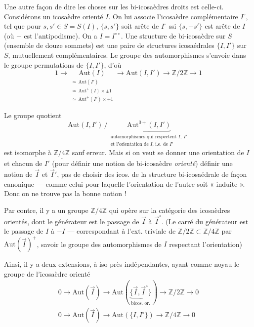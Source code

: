 \documentclass[11pt,a4paper]{article}
\begin{document}
Une autre façon de dire les choses sur les bi-icosaèdres droits est celle-ci. Considérons un icosaèdre orienté $I$. On lui associe l'icosaèdre complémentaire $I^\circ$, tel que pour $s,s'\in S = S(I)$, $\{s,s'\}$ soit arête de $I^\circ$ ssi $\{s,-s'\}$ est arête de $I$ (où $-$ est l'antipodisme). On a $I = I^{\circ\circ}$.  Une structure de bi-icosaèdre sur $S$ (ensemble de douze sommets) est une paire de structures icosaédrales $\{I,I'\}$ sur $S$, mutuellement complémentaires. Le groupe des automorphismes s'envoie dans le groupe  permutations de $\{I,I'\}$, d'où
\[
1 \longrightarrow \underset{\substack{\simeq\,\mathrm{Aut}(I')\\ \simeq\,\mathrm{Aut}^+(I)\times\pm1\\ \simeq\,\mathrm{Aut}^+(I')\times\pm1}}{\mathrm{Aut}(I)} \longrightarrow \mathrm{Aut}(I,I') \longrightarrow \mathbb Z/2\mathbb Z \longrightarrow 1
\]

Le groupe quotient
\[
\mathrm{Aut}(I,I')\,/\,\underbrace{\mathrm{Aut}^{0+}(I,I')}_{\substack{\text{automorphismes qui respectent } I,\ I'\\ \text{et l'orientation de } I \text{, i.e. de } I'}}
\]
est isomorphe à $\underline{\mathbb Z/4\mathbb Z}$ sauf erreur. Mais si on veut se donner une  orientation de $I$ et chacun de $I'$ (pour définir une notion de bi-icosaèdre \emph{orienté}) définir une notion de $\vec I$ et $\vec I'$,  pas  \struck{\ill{}} de choisir  des icos. de la structure bi-icosaédrale de façon canonique — comme celui pour laquelle l'orientation de l'autre soit « induite ». Donc on ne trouve pas la bonne notion !

Par contre, il y a un groupe $\mathbb Z/4\mathbb Z$ qui opère sur la catégorie des icosaèdres orientés, dont le générateur est  le passage de $\vec I$ à $\vec I^\circ$. (Le carré du générateur est le passage de $I$ à $-I$ — correspondant à l'ext. triviale de $\mathbb Z/2\mathbb Z\subset\mathbb Z/4\mathbb Z$ par $\mathrm{Aut}(\vec I)^+$, savoir le groupe des automorphismes de  $I$  respectant l'orientation)

Ainsi, il y a deux extensions, à iso près indépendantes, ayant comme noyau le groupe de l'icosaèdre orienté
\[
\begin{gathered}
0 \longrightarrow \mathrm{Aut}(\vec I) \longrightarrow \mathrm{Aut}(\underbrace{\{\vec I,\vec I^\circ\}}_{\text{bicos. or.}}) \longrightarrow \mathbb Z/2\mathbb Z \longrightarrow 0\\
0 \longrightarrow \mathrm{Aut}(\vec I) \longrightarrow \mathrm{Aut}(\{I,I^\circ\}) \longrightarrow \mathbb Z/4\mathbb Z \longrightarrow 0
\end{gathered}
\]
\end{document}
